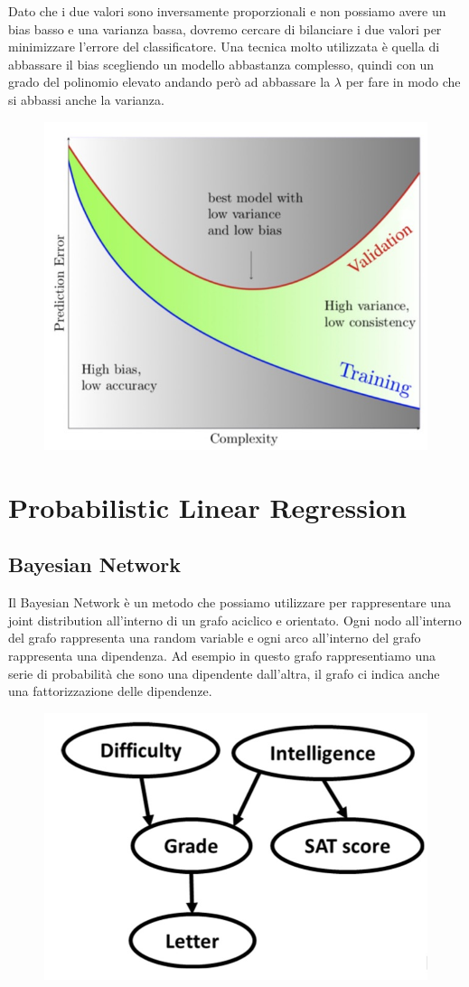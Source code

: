\documentclass[14pt]{extreport}
\begin{document}
Dato che i due valori sono inversamente proporzionali e non possiamo avere un bias basso e una varianza bassa, dovremo cercare di bilanciare i due
valori per minimizzare l'errore del classificatore. Una tecnica molto utilizzata è quella di abbassare il bias scegliendo un modello abbastanza
complesso, quindi con un grado del polinomio elevato andando però ad abbassare la $\lambda$ per fare in modo che si abbassi anche la varianza.

\begin{figure}[H]
\centering
\includegraphics[width=0.7\linewidth]{94.jpeg}
\end{figure}


\section{Probabilistic Linear Regression}

\subsection{Bayesian Network}

Il Bayesian Network è un metodo che possiamo utilizzare per rappresentare una joint distribution all'interno di un grafo aciclico e orientato. Ogni
nodo all'interno del grafo rappresenta una random variable e ogni arco all'interno del grafo rappresenta una dipendenza. Ad esempio in questo grafo
rappresentiamo una serie di probabilità che sono una dipendente dall'altra, il grafo ci indica anche una fattorizzazione delle dipendenze.

\begin{figure}[H]
\centering
\includegraphics[width=0.4\linewidth]{98.jpeg}
\end{figure}
\end{document}
